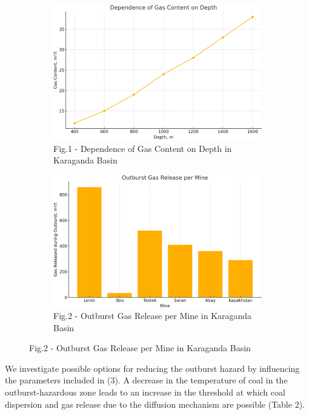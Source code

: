 \begin{figure}[H]
	\centering
	\begin{subfigure}{0.48\textwidth}
		\centering
		\includegraphics[width=\textwidth]{media/gorn2/image52}
		\caption*{Fig.1 - Dependence of Gas Content on Depth in Karaganda Basin}
	\end{subfigure}
	\begin{subfigure}{0.48\textwidth}
		\centering
		\includegraphics[width=\textwidth]{media/gorn2/image53}
		\caption*{Fig.2 - Outburst Gas Release per Mine in Karaganda Basin}
	\end{subfigure}
\end{figure}

\begin{multicols}{2}
We investigate possible options for reducing the outburst hazard by
influencing the parameters included in (3). A decrease in the
temperature of coal in the outburst-hazardous zone leads to an increase
in the threshold at which coal dispersion and gas release due to the
diffusion mechanism are possible (Table 2).
\end{multicols}

